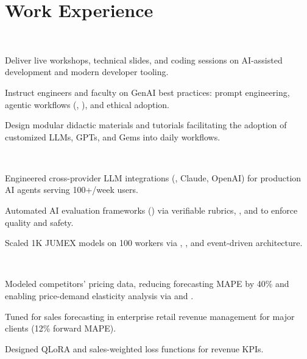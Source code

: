 \documentclass{tex/deedy-resume-openfont}
\begin{document}
\hfill
\begin{minipage}[t]{0.67\textwidth} 


\section{Work Experience}

\\
\vspace{\topsep}
\begin{tightemize}
    \item Deliver live workshops, technical slides, and coding sessions on AI-assisted development and modern developer tooling.
    \item Instruct engineers and faculty on GenAI best practices: prompt engineering, agentic workflows (, ), and ethical adoption.
    \item Design modular didactic materials and tutorials facilitating the adoption of customized LLMs, GPTs, and Gems into daily workflows.
\end{tightemize}
\sectionsep

\\
\begin{tightemize}
    \item Engineered cross-provider LLM integrations (, Claude, OpenAI) for production AI agents serving 100+/week users.
    \item Automated AI evaluation frameworks () via verifiable rubrics, , and  to enforce quality and safety.
    \item Scaled 1K JUMEX models on 100  workers via , , and event-driven architecture.
\end{tightemize}
\sectionsep

\\
\begin{tightemize}
    \item Modeled competitors' pricing data, reducing forecasting MAPE by 40\% and enabling price-demand elasticity analysis via  and .
    \item Tuned   for sales forecasting in enterprise retail revenue management for major clients (12\% forward MAPE).
    \item Designed QLoRA and sales-weighted loss functions for revenue KPIs.
\end{tightemize}
\sectionsep


\end{minipage}
\end{document}
